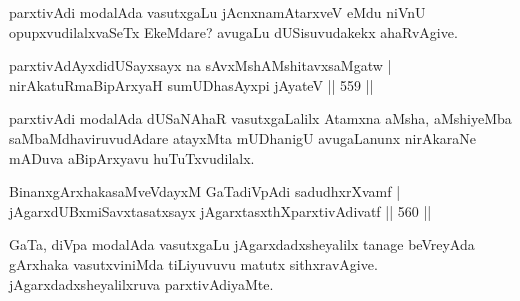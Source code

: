 \begin{artha}
parxtivAdi modalAda vasutxgaLu jAcnxnamAtarxveV eMdu niVnU opupxvudilalxvaSeTx EkeMdare? avugaLu dUSisuvudakekx ahaRvAgive.
\end{artha}


\begin{shl}
parxtivAdAyxdidUSayxsayx na \footnotemark[1]sAvxMshAMshitavxsaMgatw | \\
nirAkatuRmaBipArxyaH \footnotemark[2]sumUDhasAyxpi jAyateV \hfill||  559 ||  
\end{shl}

\begin{artha}
parxtivAdi modalAda dUSaNAhaR vasutxgaLalilx Atamxna aMsha, aMshiyeMba saMbaMdhaviruvudAdare atayxMta mUDhanigU avugaLanunx nirAkaraNe mADuva aBipArxyavu huTuTxvudilalx.
\end{artha}


\begin{shl}
\footnotemark[3]BinanxgArxhakasaMveVdayxM GaTadiVpAdi sadudhxrXvamf | \\
jAgarxdUBxmiSavxtasatxsayx jAgarxtasxthXparxtivAdivatf \hfill||  560 ||  
\end{shl}

\begin{artha}
GaTa, diVpa modalAda vasutxgaLu jAgarxdadxsheyalilx tanage beVreyAda gArxhaka vasutxviniMda tiLiyuvuvu matutx sithxravAgive. jAgarxdadxsheyalilxruva parxtivAdiyaMte.
\end{artha}

